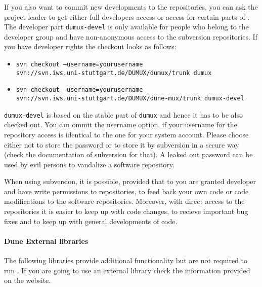 If you also want to commit new developments to the repositories, you can ask the \Dumux project leader to get either full developers access or access for certain parts of \Dumux. The developer part \texttt{dumux-devel} is only available for people who belong to the \Dumux developer group and have non-anonymous access to the subversion repositories. If you have developer rights the checkout looks as follows: 
\begin{itemize}
 \item \texttt{svn checkout --username=yourusername \\ 
      \hspace{4cm} svn://svn.iws.uni-stuttgart.de/DUMUX/dumux/trunk dumux}
 \item \texttt{svn checkout --username=yourusername \\
      \hspace{4cm} svn://svn.iws.uni-stuttgart.de/DUMUX/dune-mux/trunk dumux-devel}
\end{itemize} 
\texttt{dumux-devel} is based on the stable part of \texttt{dumux} and hence it has to be also checked out. You can ommit the username option, if your username for the repository access is identical to the one for your system account. Please choose either not to store the password or to store it by subversion in a secure way (check the documentation of subversion for that). A leaked out password can be used by evil persons to vandalize a software repository.

When using subversion, it is possible, provided that to you are granted developer and have write permissions to repositories, to feed back your own code or code modifications to the software repositories. Moreover, with direct access to the repositories it is easier to keep up with code changes, to recieve important bug fixes and to keep up with general developments of code.


\paragraph{Dune External libraries}

The following libraries provide additional functionality but are not required to run \Dumux. If you are going to use an external library check the information provided on the \Dune website.

